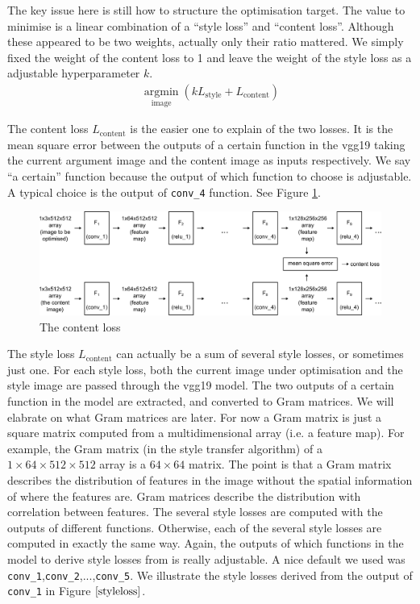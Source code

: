 \documentclass[runningheads]{llncs}
\DeclareMathOperator*{\argmin}{argmin}
\begin{document}
The key issue here is still how to structure the optimisation target.
The value to minimise is a linear combination of a ``style loss'' 
and ``content loss''.
Although these appeared to be two weights,
actually only their ratio mattered.
We simply fixed the weight of the content loss to 1 and
leave the weight of the style loss as a adjustable hyperparameter $k$.
\begin{align}
\argmin\limits_{\text{image}} (kL_\text{style}+L_\text{content})
\end{align}

The content loss $L_\text{content}$ is the easier one to explain of the two losses.
It is the mean square error between the outputs of a certain function in the
vgg19 taking the current argument image and the content image as inputs respectively.
We say ``a certain'' function because the output of which function to choose is
adjustable.
A typical choice is the output of \verb|conv_4| function. See Figure \ref{contentloss}.
\begin{figure}
\center
\includegraphics[width=\textwidth]{contentloss.pdf}
\caption{The content loss \label{contentloss}}
\end{figure}


The style loss $L_\text{content}$ can actually be a sum of several style losses, or sometimes just one.
For each style loss, 
both the current image under optimisation and the style image are passed through the vgg19 model.
The two outputs of a certain function in the model are extracted, 
and converted to Gram matrices. We will elabrate on what Gram matrices are later.
For now a Gram matrix is just a square matrix computed from a multidimensional array (i.e. a feature map).
For example, the Gram matrix (in the style transfer algorithm) of a $1\times64\times512\times512$ array
is a $64\times64$ matrix.
The point is that a Gram matrix describes the distribution of features
in the image without the spatial information of where the features are.
Gram matrices describe the distribution with correlation between features.
The several style losses are computed with the outputs of different functions.
Otherwise, each of the several style losses are computed in exactly the same way.
Again, the outputs of which functions in the model to derive style losses from is really adjustable.
A nice default we used was \verb|conv_1|,\verb|conv_2|,...,\verb|conv_5|. We illustrate
the style losses derived from the output of \verb|conv_1| in Figure $\ref{styleloss}$.
\end{document}

